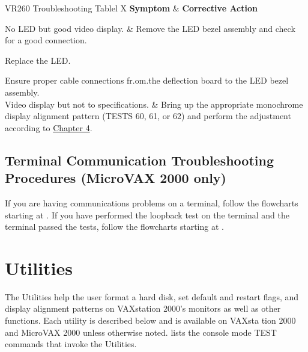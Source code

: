 \begin{tblcont}{VR260 Troubleshooting Table}{l X}
\textbf{Symptom} & \textbf{Corrective Action} \\
\hline

No LED but good video display.	&
	Remove the LED bezel assembly and check for a good connection.

	\vspace*{0.8em}
	Replace the LED.

	\vspace*{0.8em}
	Ensure proper cable connections fr.om.the deflection board
	to the LED bezel assembly.
\\
Video display but not to specifications.	&
	Bring up the appropriate monochrome display alignment
	pattern (TESTS 60, 61, or 62) and perform the adjustment
	according to \hyperlink{chapter.4}{Chapter 4}.
\\
\end{tblcont}

\newpage

\subsection{Terminal Communication Troubleshooting Procedures (MicroVAX 2000 only)}

If you are having communications problems on a terminal, follow the
flowcharts starting at . If you have performed the loopback
test on the terminal and the terminal passed the tests, follow the flowcharts
starting at .


\section{Utilities}

The Utilities help the user format a hard disk, set default and restart flags,
and display alignment patterns on VAXstation 2000's monitors as well as
other functions. Each utility is described below and is available on VAXsta
tion 2000 and MicroVAX 2000 unless otherwise noted.  lists the
console mode TEST commands that invoke the Utilities.

